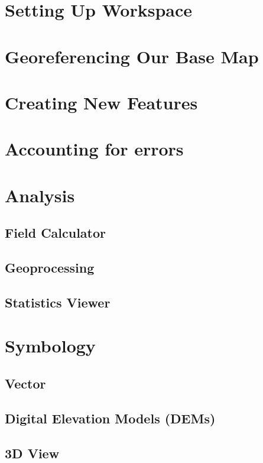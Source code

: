 \documentclass{article}
\begin{document}
\section{Setting Up Workspace}

\section{Georeferencing Our Base Map}

\section{Creating New Features}

\section{Accounting for errors}

\section{Analysis}

\subsection{Field Calculator}

\subsection{Geoprocessing}

\subsection{Statistics Viewer}

\section{Symbology}

\subsection{Vector}

\subsection{Digital Elevation Models (DEMs)}

\subsection{3D View}
\end{document}
